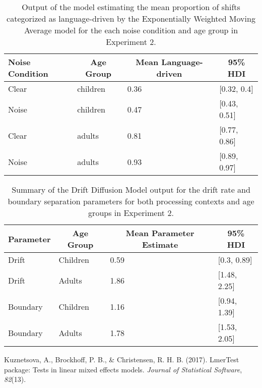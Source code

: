 \documentclass[,man,floatsintext]{apa6}
\begin{document}
\begin{appendix}
\begin{table}[h]
\begin{center}
\begin{threeparttable}
\caption{\label{tab:noise-guess-cuts}Output of the model estimating the mean proportion of shifts categorized as language-driven by the Exponentially Weighted Moving Average model for the each noise condition and age group in Experiment 2.}
\begin{tabular}{llll}
\toprule
Noise Condition & \multicolumn{1}{c}{Age Group} & \multicolumn{1}{c}{Mean Language-driven} & \multicolumn{1}{c}{95\% HDI}\\
\midrule
Clear & children & 0.36 & [0.32, 0.4]\\
Noise & children & 0.47 & [0.43, 0.51]\\
Clear & adults & 0.81 & [0.77, 0.86]\\
Noise & adults & 0.93 & [0.89, 0.97]\\
\bottomrule
\end{tabular}
\end{threeparttable}
\end{center}
\end{table}

\begin{table}[h]
\begin{center}
\begin{threeparttable}
\caption{\label{tab:noise-hddm}Summary of the Drift Diffusion Model output for the drift rate and boundary separation parameters for both processing contexts and age groups in Experiment 2.}
\begin{tabular}{llll}
\toprule
Parameter & \multicolumn{1}{c}{Age Group} & \multicolumn{1}{c}{Mean Parameter Estimate} & \multicolumn{1}{c}{95\% HDI}\\
\midrule
Drift & Children & 0.59 & [0.3, 0.89]\\
Drift & Adults & 1.86 & [1.48, 2.25]\\
Boundary & Children & 1.16 & [0.94, 1.39]\\
Boundary & Adults & 1.78 & [1.53, 2.05]\\
\bottomrule
\end{tabular}
\end{threeparttable}
\end{center}
\end{table}

\hypertarget{refs}{}
\leavevmode\hypertarget{ref-kuznetsova2017lmertest}{}%
Kuznetsova, A., Brockhoff, P. B., \& Christensen, R. H. B. (2017).
LmerTest package: Tests in linear mixed effects models. \emph{Journal of
Statistical Software}, \emph{82}(13).
\end{appendix}
\end{document}
